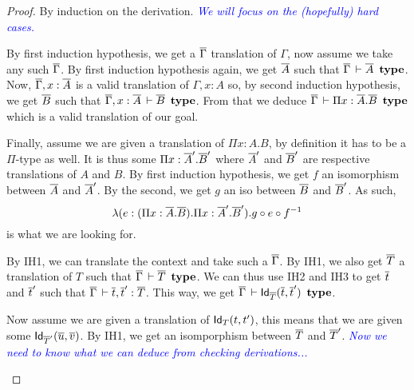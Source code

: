 \documentclass{amsart}
\newcommand\meta[1]{\noindent\textcolor{blue}{\emph{#1}}}
\begin{document}
\begin{proof}
  By induction on the derivation.
  \meta{We will focus on the (hopefully) hard cases.}
  \begin{caselist}
    \nextcase
    \begin{mathpar}
    \end{mathpar}
    By first induction hypothesis, we get a $\barG$ translation of $\Gamma$,
    now assume we take any such $\barG$.
    By first induction hypothesis again, we get $\barA$ such that
    $\barG \der \barA\ \type$.
    Now, $\barG, x:\barA$ is a valid translation of $\Gamma, x:A$ so,
    by second induction hypothesis, we get $\barB$ such that
    $\barG, x:\barA \der \barB\ \type$.
    From that we deduce $\barG \der \Pi x:\barA.\barB\ \type$ which is a valid
    translation of our goal.

    Finally, assume we are given a translation of $\Pi x:A.B$, by definition
    it has to be a $\Pi$-type as well. It is thus some $\Pi x:\barA'.\barB'$
    where $\barA'$ and $\barB'$ are respective translations of $A$ and $B$.
    By first induction hypothesis, we get $f$ an isomorphism between $\barA$
    and $\barA'$. By the second, we get $g$ an iso between $\barB$ and $\barB'$.
    As such,
    \begin{equation*}
    \lambda (e:(\Pi x:\barA.\barB).\Pi x:\barA'.\barB'). g \circ e \circ f^{-1}
    \end{equation*}
    is what we are looking for.

    \nextcase
    \begin{mathpar}
    \end{mathpar}
    By IH1, we can translate the context and take such a $\barG$.
    By IH1, we also get $\barT$ a translation of $T$ such that
    $\barG \der \barT\ \type$.
    We can thus use IH2 and IH3 to get $\bart$ and $\bart'$ such that
    $\barG \der \bart, \bart' : \barT$.
    This way, we get $\barG \der \Id{\barT}{\bart}{\bart'}\ \type$.

    Now assume we are given a translation of $\Id{T}{t}{t'}$, this means that
    we are given some $\Id{\barT'}{\baru}{\barv}$.
    By IH1, we get an isomporphism between $\barT$ and $\barT'$.
    \meta{Now we need to know what we can deduce from checking derivations...}


\end{caselist}
\end{proof}
\end{document}
